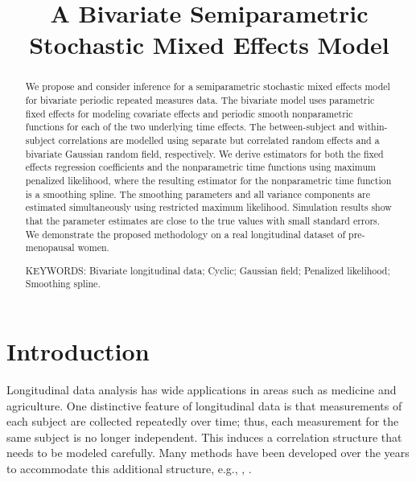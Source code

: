 \documentclass[12pt, notitlepage]{article}
\title{A Bivariate Semiparametric Stochastic Mixed Effects Model}
\date{}
\begin{document}
\maketitle


\begin{abstract}
We propose and consider inference for a semiparametric stochastic mixed effects model for bivariate periodic repeated measures data.  The bivariate model uses parametric fixed effects for modeling covariate effects and periodic smooth nonparametric functions for each of the two underlying time effects. The between-subject and within-subject correlations are modelled using separate but correlated random effects and a bivariate Gaussian random field, respectively. We derive estimators for both the fixed effects regression coefficients and the nonparametric time functions using maximum penalized likelihood, where the resulting estimator for the nonparametric time function is a smoothing spline. The smoothing parameters and all variance components are estimated simultaneously using restricted maximum likelihood.  Simulation results show that the parameter estimates are close to the true values with small standard errors. We demonstrate the proposed methodology on a real longitudinal dataset of pre-menopausal women.

\vspace{5mm}
\noindent KEYWORDS: Bivariate longitudinal data; Cyclic; Gaussian field; Penalized likelihood; Smoothing spline.
\end{abstract}


\thispagestyle{empty}
\clearpage
\setcounter{page}{1}

%
%
%
\section{Introduction}


Longitudinal data analysis has wide applications in areas such as medicine and agriculture. 
One distinctive feature of longitudinal data is that measurements of each subject are collected repeatedly over time; thus, each measurement for the same subject is no longer independent.  This induces a correlation structure that needs to be modeled carefully. Many methods have been developed over the years to accommodate this additional structure, e.g., \cite{Laird:1982}, \cite{Liang:1986}. 
\end{document}
